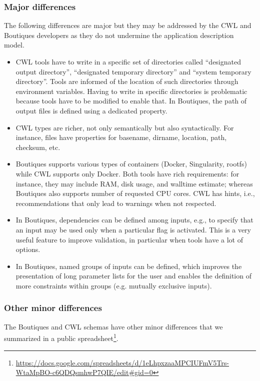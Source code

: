 \documentclass{article}
\newcommand{\boutiques}{Boutiques\xspace}
\begin{document}
\subsubsection{Major differences}

The following differences are major but they may be addressed by the
CWL and \boutiques developers as they do not undermine the application
description model.

\begin{itemize}
\item CWL tools have to write in a specific set of directories called
``designated output directory'', ``designated temporary directory''
and ``system temporary directory''. Tools are informed of the location
of such directories through environment variables. Having to write in
specific directories is problematic because tools have to be modified
to enable that. In \boutiques, the path of output files is defined
using a dedicated property.
\item CWL types are richer, not only
semantically but also syntactically. For instance, files have
properties for basename, dirname, location, path, checksum, etc.
\item \boutiques supports various types of containers (Docker, Singularity,
rootfs) while CWL supports only Docker. Both tools have rich requirements:
for instance, they may include RAM, disk usage, and walltime estimate; 
whereas \boutiques also supports number of requested CPU cores. CWL has hints, i.e.,
recommendations that only lead to warnings when not respected.
\item In \boutiques, dependencies can be defined among inputs, e.g., to
specify that an input may be used only when a particular flag is
activated. This is a very useful feature to improve validation, in
particular when tools have a lot of options.
\item In \boutiques, named
groups of inputs can be defined, which improves the presentation of
long parameter lists for the user and enables the definition of more
constraints within groups (e.g. mutually exclusive inputs).
\end{itemize}

\subsubsection{Other minor differences}

The \boutiques and CWL schemas have other minor differences that we
summarized in a public
spreadsheet\footnote{\url{https://docs.google.com/spreadsheets/d/1eLhpxzaaMPCIUFmV5Trs-WtaMpBO-c6QDQsmhwP7QIE/edit\#gid=0}}.
\end{document}
